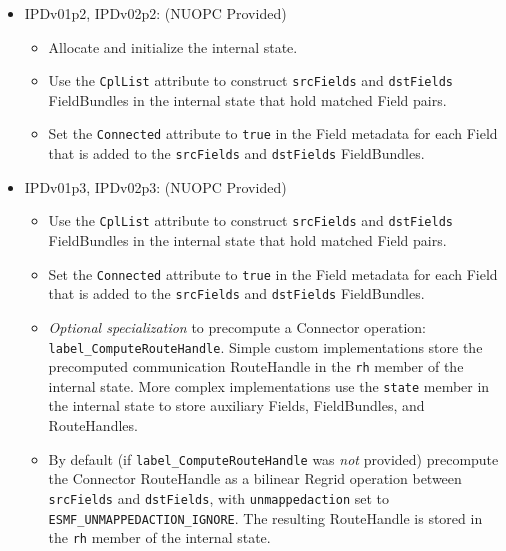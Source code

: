 \begin{itemize}
\begin{itemize}
  \end{itemize}
\item IPDv01p2, IPDv02p2: ({\sc NUOPC Provided})
  \begin{itemize}
  \item Allocate and initialize the internal state.
  \item Use the {\tt CplList} attribute to construct {\tt srcFields} and {\tt dstFields} FieldBundles in the internal state that hold matched Field pairs.
  \item Set the {\tt Connected} attribute to {\tt true} in the Field metadata for each Field that is added to the {\tt srcFields} and {\tt dstFields} FieldBundles.
  \end{itemize}  
\item IPDv01p3, IPDv02p3: ({\sc NUOPC Provided})
  \begin{itemize}
  \item Use the {\tt CplList} attribute to construct {\tt srcFields} and {\tt dstFields} FieldBundles in the internal state that hold matched Field pairs.
  \item Set the {\tt Connected} attribute to {\tt true} in the Field metadata for each Field that is added to the {\tt srcFields} and {\tt dstFields} FieldBundles.
  \item {\it Optional specialization} to precompute a Connector operation: {\tt label\_ComputeRouteHandle}. Simple custom implementations store the precomputed communication RouteHandle in the {\tt rh} member of the internal state. More complex implementations use the {\tt state} member in the internal state to store auxiliary Fields, FieldBundles, and RouteHandles.
  \item By default (if {\tt label\_ComputeRouteHandle} was {\em not} provided) precompute the Connector RouteHandle as a bilinear Regrid operation between {\tt srcFields} and {\tt dstFields}, with {\tt unmappedaction} set to {\tt ESMF\_UNMAPPEDACTION\_IGNORE}. The resulting RouteHandle is stored in the {\tt rh} member of the internal state.
  \end{itemize}  
\end{itemize}


